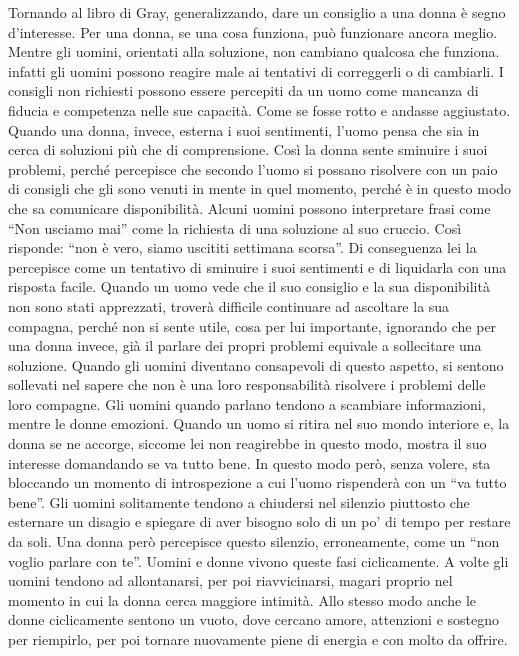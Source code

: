 \documentclass[12pt]{book} %
\begin{document}
Tornando al libro di Gray, generalizzando, dare un consiglio a una donna è segno d'interesse. Per una donna, se una cosa funziona, può
funzionare ancora meglio. Mentre gli uomini, orientati alla soluzione, non cambiano qualcosa che funziona. infatti gli
uomini possono reagire male ai tentativi di correggerli o di cambiarli. I consigli non richiesti possono essere percepiti da
un uomo come mancanza di fiducia e competenza nelle sue capacità. Come se fosse rotto e andasse aggiustato. Quando una
donna, invece, esterna i suoi sentimenti, l'uomo pensa che sia in cerca di soluzioni più che di
comprensione. Così la donna sente sminuire i suoi problemi, perché percepisce che secondo l'uomo
si possano risolvere con un paio di consigli che gli sono venuti in mente in quel momento, perché è in questo modo
che sa comunicare disponibilità. Alcuni uomini possono interpretare frasi come “Non usciamo mai” come la richiesta di una soluzione al suo cruccio. 
Così risponde: “non è vero, siamo uscititi settimana scorsa”. Di conseguenza lei la percepisce come un tentativo di sminuire i suoi sentimenti e di
liquidarla con una risposta facile. Quando un uomo vede che il suo consiglio e la sua disponibilità non sono stati
apprezzati, troverà difficile continuare ad ascoltare la sua compagna, perché non si sente utile, cosa per lui
importante, ignorando che per una donna invece, già il parlare dei propri problemi equivale a sollecitare una soluzione.
Quando gli uomini diventano consapevoli di questo aspetto, si sentono sollevati nel sapere che non è una loro
responsabilità risolvere i problemi delle loro compagne. Gli uomini quando parlano tendono a scambiare informazioni,
mentre le donne emozioni. Quando un uomo si ritira nel suo mondo interiore e, la donna se ne accorge,
siccome lei non reagirebbe in questo modo, mostra il suo interesse domandando se va tutto bene. In questo modo però, senza volere, sta bloccando un momento di introspezione a cui l'uomo rispenderà con un “va
tutto bene”. Gli uomini solitamente tendono a chiudersi nel silenzio piuttosto che esternare un disagio e spiegare di
aver bisogno solo di un po' di tempo per restare da soli. Una donna però percepisce questo silenzio, erroneamente, come
un “non voglio parlare con te”. Uomini e donne vivono queste fasi ciclicamente. A volte gli uomini tendono ad
allontanarsi, per poi riavvicinarsi, magari proprio nel momento in cui la donna cerca maggiore intimità. Allo stesso
modo anche le donne ciclicamente sentono un vuoto, dove cercano amore, attenzioni e sostegno per riempirlo, per poi
tornare nuovamente piene di energia e con molto da offrire. 
\end{document}
